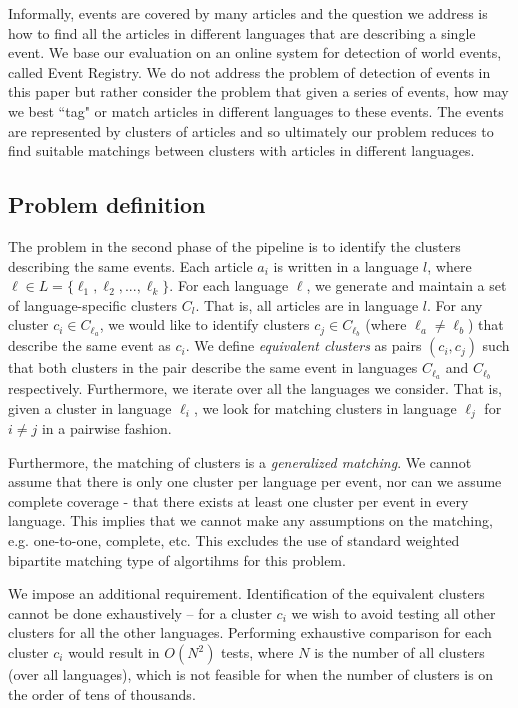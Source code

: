 \documentclass[twoside,11pt]{article}
\begin{document}
Informally, events are covered by many articles and the question we address is how to find all the articles in different languages that are describing a single event. We base our evaluation on an online system for detection of world events, called Event Registry\cite{}. We do not address the problem of detection of events in this paper but rather consider the problem that given a series of events, how may we best ``tag" or match articles in different languages to these events. The events are represented by clusters of articles and so ultimately our problem reduces to find suitable matchings between clusters with articles in different languages. 


\subsection{Problem definition}

The problem in the second phase of the pipeline is to identify the clusters describing the same events. Each article $a_i$ is written in a language $l$, where $\ell \in L = \{\ell_1,\ell_2,...,\ell_k\}$. For each language $\ell$, we generate and maintain a set of language-specific clusters $C_l$. That is, all articles are in language $l$. For any cluster $c_i \in C_{\ell_a}$, we would like to identify clusters $c_j \in C_{\ell_b}$ (where $\ell_a \neq \ell_b$) that describe the same event as $c_i$. We define \emph{equivalent clusters} as  pairs $(c_i,c_j)$ such that both clusters in the pair describe the same event in languages $C_{\ell_a}$ and $C_{\ell_b}$ respectively. Furthermore, we iterate over all the languages we consider. That is, given a cluster in language $\ell_i$, we look for matching clusters in language $\ell_j$ for $i\neq j$  in a pairwise fashion. 

Furthermore, the matching of clusters is a \emph{generalized matching}. We cannot assume that there is only one cluster per language per event, nor can we assume complete coverage - that there exists at least one cluster per event in every language. This implies that we cannot make any assumptions on the matching, e.g. one-to-one, complete, etc. This excludes the use of standard weighted bipartite matching type of algortihms for this problem. 	

We impose an additional requirement.  Identification of the equivalent clusters cannot be done exhaustively -- for a cluster $c_i$ we wish to avoid testing all other clusters for all the other languages. Performing exhaustive comparison for each cluster $c_i$ would result in $O(N^2)$ tests, where $N$ is the number of all clusters (over all languages), which is not feasible for when the number of clusters is on the order of tens of thousands. 
\end{document}
